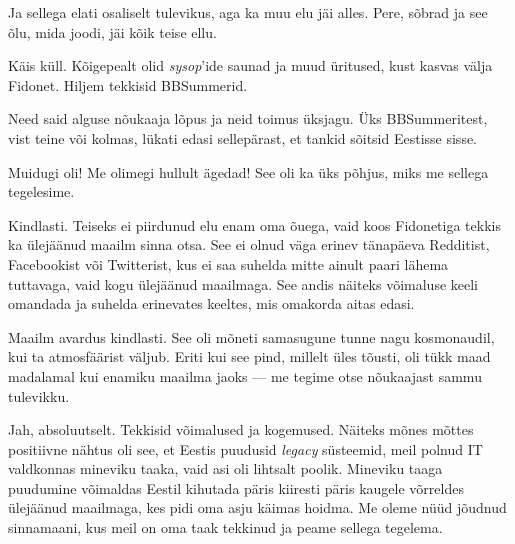 
Ja sellega elati osaliselt tulevikus, aga ka muu elu jäi alles. Pere, sõbrad ja see õlu, mida joodi, jäi kõik teise ellu.


Käis küll. Kõigepealt olid \emph{sysop}'ide saunad ja muud üritused, kust kasvas välja Fidonet. Hiljem tekkisid
BBSummerid.


Need said alguse nõukaaja lõpus ja neid toimus üksjagu. Üks 
BBSummeritest, vist teine või kolmas, lükati edasi sellepärast, et tankid sõitsid Eestisse 
sisse.


Muidugi oli! Me olimegi hullult ägedad! See oli ka üks põhjus, miks me sellega tegelesime.


Kindlasti. Teiseks ei piirdunud elu enam oma õuega, vaid koos Fidonetiga tekkis ka ülejäänud maailm sinna otsa. See ei 
olnud väga erinev tänapäeva Redditist, Facebookist või Twitterist, kus ei
saa suhelda mitte ainult paari lähema tuttavaga, vaid kogu ülejäänud 
maailmaga. See andis 
näiteks võimaluse keeli omandada ja suhelda erinevates keeltes, mis omakorda aitas edasi.


Maailm avardus kindlasti. See oli mõneti samasugune tunne nagu 
kosmonaudil, kui ta atmosfäärist väljub. Eriti kui see pind, millelt üles 
tõusti, oli tükk maad madalamal kui enamiku maailma jaoks --- me tegime
otse nõukaajast sammu tulevikku.


Jah, absoluutselt. Tekkisid võimalused ja kogemused. Näiteks mõnes mõttes 
positiivne nähtus oli see, et Eestis puudusid \emph{legacy} süsteemid, meil 
polnud IT valdkonnas mineviku taaka, vaid asi oli lihtsalt poolik. 
Mineviku taaga puudumine võimaldas Eestil kihutada päris kiiresti 
päris kaugele võrreldes ülejäänud maailmaga, kes pidi oma asju käimas hoidma. 
Me oleme nüüd jõudnud sinnamaani, kus meil on oma taak tekkinud ja peame 
sellega tegelema.

